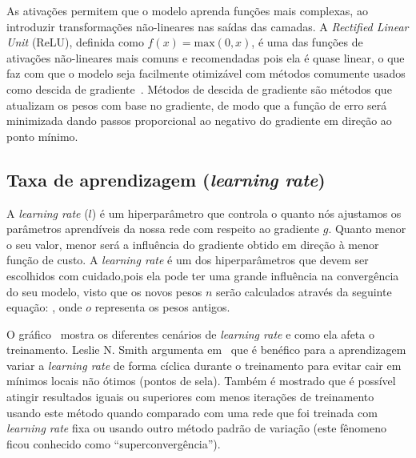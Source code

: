 As ativações permitem que o modelo aprenda funções mais complexas, ao introduzir transformações não-lineares nas saídas das camadas. A \textit{Rectified Linear Unit} (\acrshort{ReLU}), definida como $f(x) = \text{max}(0, x)$, é uma das funções de ativações não-lineares mais comuns e recomendadas pois ela é quase linear, o que faz com que o modelo seja facilmente otimizável com métodos comumente usados como descida de gradiente~\cite{rumelhart1988learning}. Métodos de descida de gradiente são métodos que atualizam os pesos com base no gradiente, de modo que a função de erro será minimizada dando passos proporcional ao negativo do gradiente em direção ao ponto mínimo. 


\subsection{Taxa de aprendizagem (\textit{learning rate})}
A \textit{learning rate} ($l$) é um hiperparâmetro que controla o quanto nós ajustamos os parâmetros aprendíveis da nossa rede com respeito ao gradiente $g$. Quanto menor o seu valor, menor será a influência do gradiente obtido em direção à menor função de custo. A \textit{learning rate} é um dos hiperparâmetros que devem ser escolhidos com cuidado,pois ela pode ter uma grande influência na convergência do seu modelo, visto que os novos pesos $n$ serão calculados através da seguinte equação: , onde $o$ representa os pesos antigos.

O gráfico~ mostra os diferentes cenários de \textit{learning rate} e como ela afeta o treinamento.
Leslie N. Smith argumenta em~\cite{smith2017cyclical} que é benéfico para a aprendizagem variar a \textit{learning rate} de forma cíclica durante o treinamento para evitar cair em mínimos locais não ótimos (pontos de sela). Também é mostrado que é possível atingir resultados iguais ou superiores com menos iterações de treinamento usando este método quando comparado com uma rede que foi treinada com \textit{learning rate} fixa ou usando outro método padrão de variação (este fênomeno ficou conhecido como ``superconvergência'').

